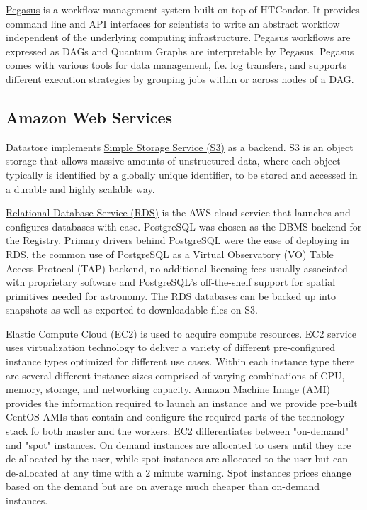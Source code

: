 \documentclass[a4paper, 10pt, conference]{ieeeconf}
\begin{document}
\href{https://pegasus.isi.edu/}{Pegasus} \cite{Deelman:2015:Pegasus} is a workflow management system built on top of HTCondor.
It provides command line and API interfaces for scientists to write an abstract workflow independent of the underlying computing infrastructure. Pegasus workflows are expressed as DAGs and Quantum Graphs are interpretable by Pegasus. Pegasus comes with various tools for data management, f.e. log transfers, and supports different execution strategies by grouping jobs within or across nodes of a DAG.


\subsection{Amazon Web Services}

Datastore implements \href{https://aws.amazon.com/s3/}{Simple Storage Service (S3)} as a backend. S3 is an object storage that allows massive amounts of unstructured data, where each object typically is identified by a globally unique identifier, to be stored and accessed in a durable and highly scalable way.

\href{https://aws.amazon.com/rds/}{Relational Database Service (RDS)} is the AWS cloud service that launches and configures databases with ease. PostgreSQL was chosen as the DBMS backend for the Registry. Primary drivers behind PostgreSQL were the ease of deploying in RDS, the common use of PostgreSQL as a Virtual Observatory (VO) Table Access Protocol (TAP) backend, no additional licensing fees usually associated with proprietary software and PostgreSQL's off-the-shelf support for spatial primitives needed for astronomy. The RDS databases can be backed up into snapshots as well as exported to downloadable files on S3.

Elastic Compute Cloud (EC2) is used to acquire compute resources.  EC2 service uses virtualization technology to deliver a variety of different pre-configured instance types optimized for different use cases. Within each instance type there are several different instance sizes comprised of varying combinations of CPU, memory, storage, and networking capacity. Amazon Machine Image (AMI) provides the information required to launch an instance and we provide pre-built CentOS AMIs that contain and configure the required parts of the technology stack fo both master and the workers. EC2 differentiates between "on-demand" and "spot" instances. On demand instances are allocated to users until they are de-allocated by the user, while spot instances are allocated to the user but can de-allocated at any time with a 2 minute warning. Spot instances prices change based on the demand but are on average much cheaper than on-demand instances.
\end{document}
